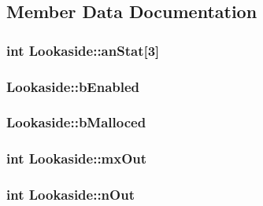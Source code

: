 \subsection{Member Data Documentation}
\hypertarget{struct_lookaside_a7d875204cb05a327bb1652139faa4374}{
\subsubsection[{an\-Stat}]{\setlength{\rightskip}{0pt plus 5cm}int Lookaside\-::an\-Stat\mbox{[}3\mbox{]}}}\label{struct_lookaside_a7d875204cb05a327bb1652139faa4374}
\hypertarget{struct_lookaside_adbe2c3486f893c30525e19388f35eb21}{
\subsubsection[{b\-Enabled}]{ Lookaside\-::b\-Enabled}}\label{struct_lookaside_adbe2c3486f893c30525e19388f35eb21}
\hypertarget{struct_lookaside_a218f14cf9eb2c430867d286e9ac57ac5}{
\subsubsection[{b\-Malloced}]{ Lookaside\-::b\-Malloced}}\label{struct_lookaside_a218f14cf9eb2c430867d286e9ac57ac5}
\hypertarget{struct_lookaside_a2ce364d95b55913df986999de442e4f9}{
\subsubsection[{mx\-Out}]{\setlength{\rightskip}{0pt plus 5cm}int Lookaside\-::mx\-Out}}\label{struct_lookaside_a2ce364d95b55913df986999de442e4f9}
\hypertarget{struct_lookaside_a4cdd49fa554f877928d5bb31d55b32e9}{
\subsubsection[{n\-Out}]{\setlength{\rightskip}{0pt plus 5cm}int Lookaside\-::n\-Out}}\label{struct_lookaside_a4cdd49fa554f877928d5bb31d55b32e9}
